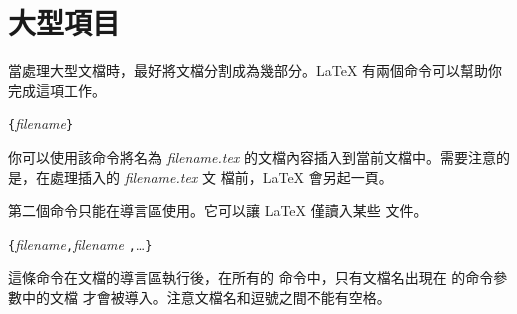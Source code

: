 %
%



%

\section{大型項目}

當處理大型文檔時，最好將文檔分割成為幾部分。\LaTeX{} 有兩個命令可以幫助你完成這項工作。

\begin{lscommand}
\verb|{|\emph{filename}\verb|}|
\end{lscommand}
\noindent %
你可以使用該命令將名為 \emph{filename.tex} 的文檔內容插入到當前文檔中。需要注意的是，在處理插入的 \emph{filename.tex} 文
檔前，\LaTeX{} 會另起一頁。


第二個命令只能在導言區使用。它可以讓 \LaTeX{} 僅讀入某些 \verb|| 文件。
\begin{lscommand}
\verb|{|\emph{filename}\verb|,|\emph{filename}%
\verb|,|\ldots\verb|}|
\end{lscommand}
這條命令在文檔的導言區執行後，在所有的  命令中，只有文檔名出現在  的命令參數中的文檔
才會被導入。注意文檔名和逗號之間不能有空格。



